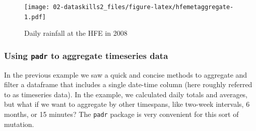 \documentclass[]{book}
\newenvironment{Shaded}{\begin{snugshade}}{\end{snugshade}}
\newcommand{\CommentTok}[1]{\textcolor[rgb]{0.56,0.35,0.01}{\textit{#1}}}
\newcommand{\DataTypeTok}[1]{\textcolor[rgb]{0.13,0.29,0.53}{#1}}
\newcommand{\KeywordTok}[1]{\textcolor[rgb]{0.13,0.29,0.53}{\textbf{#1}}}
\newcommand{\NormalTok}[1]{#1}
\newcommand{\OperatorTok}[1]{\textcolor[rgb]{0.81,0.36,0.00}{\textbf{#1}}}
\newcommand{\StringTok}[1]{\textcolor[rgb]{0.31,0.60,0.02}{#1}}
\begin{document}
\begin{Shaded}
\end{Shaded}

\begin{figure}
\centering
\texttt{[image: 02-dataskills2\_files/figure-latex/hfemetaggregate-1.pdf]}
\caption{\label{fig:hfemetaggregate}Daily rainfall at the HFE in 2008}
\end{figure}

\hypertarget{using-padr-to-aggregate-timeseries-data}{%
\subsubsection{\texorpdfstring{Using \texttt{padr} to aggregate timeseries data}{Using padr to aggregate timeseries data}}\label{using-padr-to-aggregate-timeseries-data}}

In the previous example we saw a quick and concise methods to aggregate and filter a dataframe that includes a single date-time column (here roughly referred to as timeseries data). In the example, we calculated daily totals and averages, but what if we want to aggregate by other timespans, like two-week intervals, 6 months, or 15 minutes? The \texttt{padr} package is very convenient for this sort of mutation.
\end{document}
